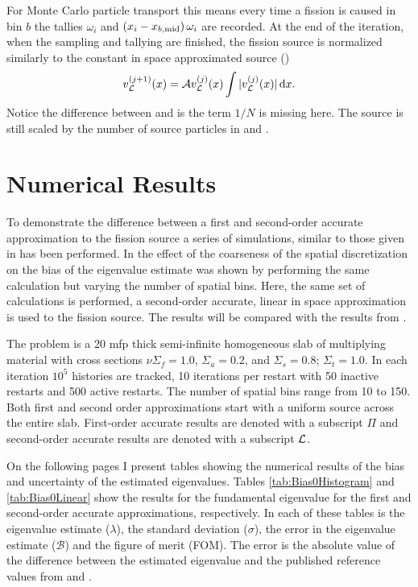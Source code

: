 For Monte Carlo particle transport this means every time a fission is caused in bin $b$ the tallies $\omega_i$ and  $\left(x_i - x_{b,\mathrm{mid}}\right)\omega_i$ are recorded.  At the end of the iteration, when the sampling and tallying are finished, the fission source is normalized similarly to the constant in space approximated source ()
\begin{equation}
    v_{\mathcal{L}}^{(j+1)}(x) = \mathcal{A} v_{\mathcal{L}}^{(j)}(x) \int |v_{\mathcal{L}}^{(j)}(x)| \mathop{}\!\mathrm{d} x.
    \label{eq:SecondOrderSourceScaling}
\end{equation}
Notice the difference between  and  is the term $1/N$ is missing here.  The source is still scaled by the number of source particles in  and .

\section{Numerical Results}
To demonstrate the difference between a first and second-order accurate approximation to the fission source a series of simulations, similar to those given in  has been performed.  In  the effect of the coarseness of the spatial discretization on the bias of the eigenvalue estimate was shown by performing the same calculation but varying the number of spatial bins.  Here, the same set of calculations is performed,  a second-order accurate, linear in space approximation is used to the fission source.  The results will be compared with the results from .

The problem is a 20 mfp thick semi-infinite homogeneous slab of multiplying material with cross sections \mbox{$\nu\Sigma_f = 1.0$}, \mbox{$\Sigma_a = 0.2$}, and \mbox{$\Sigma_s = 0.8$}; \mbox{$\Sigma_t = 1.0$}.  In each iteration $10^5$ histories are tracked, 10 iterations per restart with 50 inactive restarts and 500 active restarts.  The number of spatial bins range from 10 to 150.  Both first and second order approximations start with a uniform source across the entire slab.  First-order accurate results are denoted with a subscript $\Pi$ and second-order accurate results are denoted with a subscript $\mathcal{L}$.

On the following pages I present tables showing the numerical results of the bias and uncertainty of the estimated eigenvalues.  Tables \ref{tab:Bias0Histogram} and \ref{tab:Bias0Linear} show the results for the fundamental eigenvalue for the first and second-order accurate approximations, respectively.  In each of these tables is the eigenvalue estimate ($\lambda$), the standard deviation ($\sigma$), the error in the eigenvalue estimate ($\mathcal{B}$) and the figure of merit (FOM).  The error is the absolute value of the difference between the estimated eigenvalue and the published reference values from \cite{Garis:1991One-s-0} and \cite{Dahl:1979Eigen-0}.

